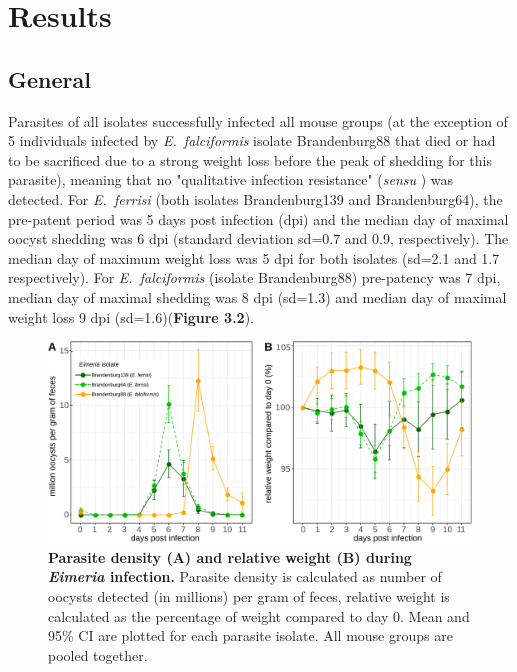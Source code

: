 \section{Results}

\subsection{General}

Parasites of all isolates successfully infected all mouse groups (at the exception of 5 individuals infected by \textit{E.~falciformis} isolate Brandenburg88 that died or had to be sacrificed due to a strong weight loss before the peak of shedding for this parasite), meaning that no "qualitative infection resistance" (\textit{sensu} \cite{Gandon2000}) was detected. For \textit{E.~ferrisi }(both isolates Brandenburg139 and Brandenburg64), the pre-patent period was 5 days post infection (dpi) and the median day of maximal oocyst shedding was 6 dpi (standard deviation sd=0.7 and 0.9, respectively). The median day of maximum weight loss was 5 dpi for both isolates (sd=2.1 and 1.7 respectively). For \textit{E.~falciformis} (isolate Brandenburg88) pre-patency was 7 dpi, median day of maximal shedding was 8 dpi (sd=1.3) and median day of maximal weight loss 9 dpi (sd=1.6)(\textbf{Figure 3.2}). 

\begin{figure}[H]
    \centering
    \includegraphics[width=\linewidth,height=\textheight,keepaspectratio]{images/3article2/Fig2_final.pdf}
    \caption{\textbf{Parasite density (A) and relative weight (B) during \textit{Eimeria} infection.} Parasite density is calculated as number of oocysts detected (in millions) per gram of feces, relative weight is calculated as the percentage of weight compared to day 0. Mean and 95\% CI are plotted for each parasite isolate. All mouse groups are pooled together.}
\end{figure}

